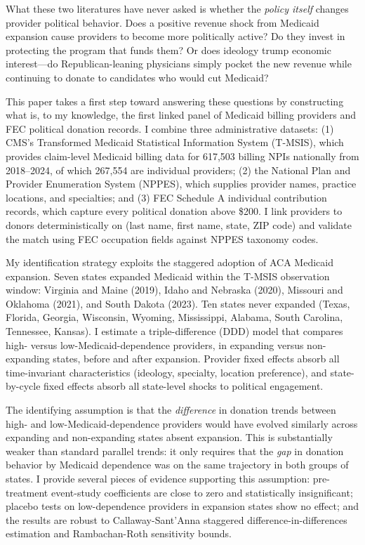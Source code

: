 \documentclass[12pt]{article}
\begin{document}
What these two literatures have never asked is whether the \textit{policy itself} changes provider political behavior. Does a positive revenue shock from Medicaid expansion cause providers to become more politically active? Do they invest in protecting the program that funds them? Or does ideology trump economic interest---do Republican-leaning physicians simply pocket the new revenue while continuing to donate to candidates who would cut Medicaid?

This paper takes a first step toward answering these questions by constructing what is, to my knowledge, the first linked panel of Medicaid billing providers and FEC political donation records. I combine three administrative datasets: (1) CMS's Transformed Medicaid Statistical Information System (T-MSIS), which provides claim-level Medicaid billing data for 617,503 billing NPIs nationally from 2018--2024, of which 267,554 are individual providers; (2) the National Plan and Provider Enumeration System (NPPES), which supplies provider names, practice locations, and specialties; and (3) FEC Schedule A individual contribution records, which capture every political donation above \$200. I link providers to donors deterministically on (last name, first name, state, ZIP code) and validate the match using FEC occupation fields against NPPES taxonomy codes.

My identification strategy exploits the staggered adoption of ACA Medicaid expansion. Seven states expanded Medicaid within the T-MSIS observation window: Virginia and Maine (2019), Idaho and Nebraska (2020), Missouri and Oklahoma (2021), and South Dakota (2023). Ten states never expanded (Texas, Florida, Georgia, Wisconsin, Wyoming, Mississippi, Alabama, South Carolina, Tennessee, Kansas). I estimate a triple-difference (DDD) model that compares high- versus low-Medicaid-dependence providers, in expanding versus non-expanding states, before and after expansion. Provider fixed effects absorb all time-invariant characteristics (ideology, specialty, location preference), and state-by-cycle fixed effects absorb all state-level shocks to political engagement.

The identifying assumption is that the \textit{difference} in donation trends between high- and low-Medicaid-dependence providers would have evolved similarly across expanding and non-expanding states absent expansion. This is substantially weaker than standard parallel trends: it only requires that the \textit{gap} in donation behavior by Medicaid dependence was on the same trajectory in both groups of states. I provide several pieces of evidence supporting this assumption: pre-treatment event-study coefficients are close to zero and statistically insignificant; placebo tests on low-dependence providers in expansion states show no effect; and the results are robust to Callaway-Sant'Anna staggered difference-in-differences estimation and Rambachan-Roth sensitivity bounds.
\end{document}
